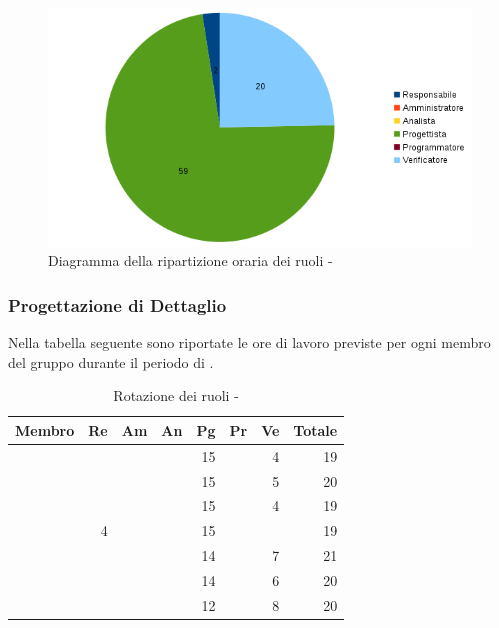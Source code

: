 \documentclass[12pt,a4paper]{article}
\begin{document}
\begin{center}
	\begin{figure}[H]
		\centering	
	    \includegraphics[width=\textwidth]{../img/diagrammaTortaProgettazioneArchitetturaleTotaleOre.png}
		\caption{Diagramma della ripartizione oraria dei ruoli - \FPA{}}
	\end{figure}
\end{center}

\newpage
\subsubsection{Progettazione di Dettaglio}

Nella tabella seguente sono riportate le ore di lavoro previste per ogni membro del gruppo durante il periodo di \FPD{}.

\begin{table}[H]
	\begin{center}
		\begin{tabular}{l r r r r r r r}
			\toprule
			\textbf{Membro}	&	\textbf{Re}	&	\textbf{Am}	& \textbf{An} & \textbf{Pg} & \textbf{Pr} & \textbf{Ve} & \textbf{Totale}\\
			\midrule
			\midrule
			\IB{} & & & & 15 & & 4 & 19 \\
			\midrule
			\AB{} & & & & 15 & & 5 & 20 \\
			\midrule
			\NDC{} & & & & 15 & & 4 & 19 \\
			\midrule
			\TP{} & 4 & & & 15 & & & 19 \\
			\midrule
			\WS{} & & & & 14 & & 7 & 21 \\
			\midrule
			\AVE{} & & & & 14 & & 6 & 20 \\
			\midrule
			\AVI{} & & & & 12 & & 8 & 20 \\
			\bottomrule
		\end{tabular}
		\caption{Rotazione dei ruoli - \FPD{}}
	\end{center}
\end{table}
\end{document}
